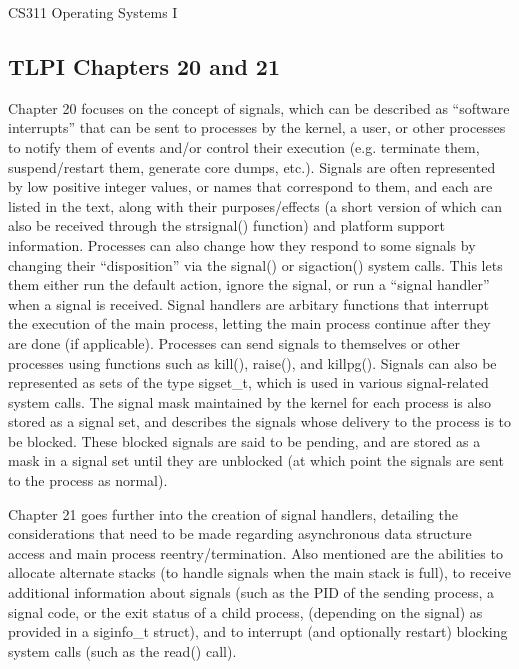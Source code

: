 \documentclass[letterpaper,10pt,fleqn]{article}
\numberwithin{equation}{section}
\begin{document}



{\Large CS311 Operating Systems I}

\subsection*{TLPI Chapters 20 and 21}

Chapter 20 focuses on the concept of signals, which can be described as ``software interrupts'' that can be sent to processes by the kernel, a user, or other processes to notify them of events and/or control their execution (e.g. terminate them, suspend/restart them, generate core dumps, etc.).  Signals are often represented by low positive integer values, or names that correspond to them, and each are listed in the text, along with their purposes/effects (a short version of which can also be received through the strsignal() function) and platform support information.  Processes can also change how they respond to some signals by changing their ``disposition'' via the signal() or sigaction() system calls.  This lets them either run the default action, ignore the signal, or run a ``signal handler'' when a signal is received.  Signal handlers are arbitary functions that interrupt the execution of the main process, letting the main process continue after they are done (if applicable).  Processes can send signals to themselves or other processes using functions such as kill(), raise(), and killpg().  Signals can also be represented as sets of the type sigset\_t, which is used in various signal-related system calls.  The signal mask maintained by the kernel for each process is also stored as a signal set, and describes the signals whose delivery to the process is to be blocked.  These blocked signals are said to be pending, and are stored as a mask in a signal set until they are unblocked (at which point the signals are sent to the process as normal).

Chapter 21 goes further into the creation of signal handlers, detailing the considerations that need to be made regarding asynchronous data structure access and main process reentry/termination.  Also mentioned are the abilities to allocate alternate stacks (to handle signals when the main stack is full), to receive additional information about signals (such as the PID of the sending process, a signal code, or the exit status of a child process, (depending on the signal) as provided in a siginfo\_t struct), and to interrupt (and optionally restart) blocking system calls (such as the read() call).
\end{document}
